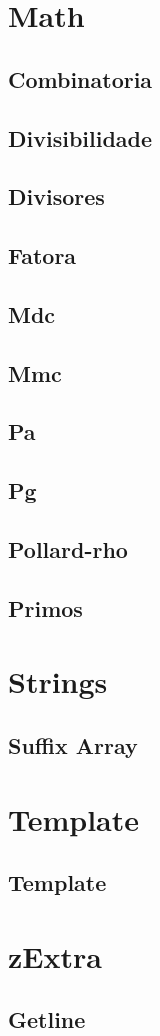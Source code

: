 \documentclass{article}
\newcommand\includes[2]{ %
   \subsection{#1}
   
}
\begin{document}
\begin{multicols}{2}
\section{Math}
\includes{Combinatoria}{Materiais/Math/combinatoria.cpp}
\includes{Divisibilidade}{Materiais/Math/divisibilidade.cpp}
\includes{Divisores}{Materiais/Math/divisores.cpp}
\includes{Fatora}{Materiais/Math/fatora.cpp}
\includes{Mdc}{Materiais/Math/mdc.cpp}
\includes{Mmc}{Materiais/Math/mmc.cpp}
\includes{Pa}{Materiais/Math/pa.cpp}
\includes{Pg}{Materiais/Math/pg.cpp}
\includes{Pollard-rho}{Materiais/Math/pollard-rho.cpp}
\includes{Primos}{Materiais/Math/primos.cpp}
\section{Strings}
\includes{Suffix Array}{Materiais/Strings/suffix_array.cpp}
\section{Template}
\includes{Template}{Materiais/Template/template.cpp}
\section{zExtra}
\includes{Getline}{Materiais/zExtra/getline.cpp}

\end{multicols}
\end{document}
